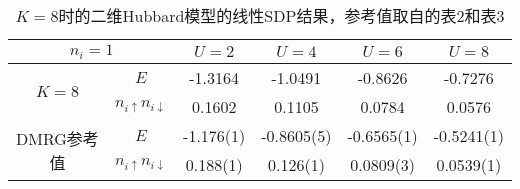 
\begin{table}
    \caption{$K = 8$时的二维Hubbard模型的线性SDP结果，参考值取自\parencite{han_manybody}的表2和表3}
    \label{tbl:hubbard-2d-linear-sdp}
    \centering
    \begin{tabular}{cccccc}
        \toprule
        \multicolumn{2}{c}{$n_i=1$}                                 & $U=2$   & $U=4$   & $U=6$   & $U=8$  \\
        \midrule
        \multirow{2}{*}{$K=8$}     & $E$                               & -1.3164 & -1.0491 & -0.8626 & -0.7276  \\
                                    & $n_{i \uparrow} n_{i \downarrow}$ &  0.1602 &  0.1105 &  0.0784 &  0.0576  \\
        \midrule
        \multirow{2}{*}{DMRG参考值}  & $E$                               & -1.176(1) & -0.8605(5) & -0.6565(1) & -0.5241(1)  \\
                                    & $n_{i \uparrow} n_{i \downarrow}$ &  0.188(1) &  0.126(1) &  0.0809(3) &  0.0539(1)  \\
        \bottomrule
    \end{tabular}
\end{table}